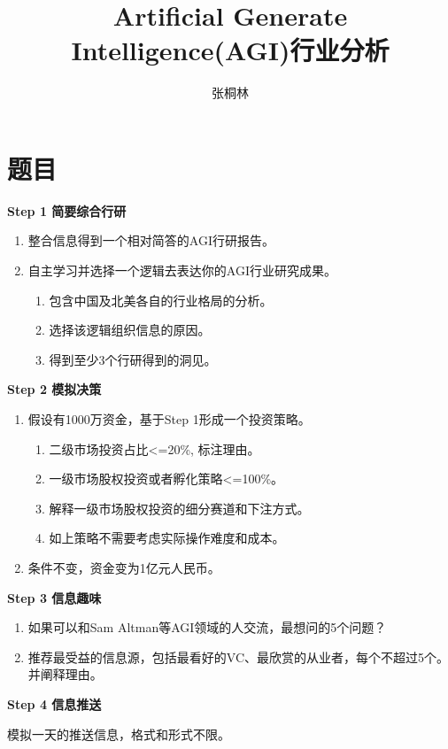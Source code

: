 \documentclass[fontset=overleaf，12pt]{ctexart}
\title{Artificial Generate Intelligence(AGI){\songti 行业分析}}
\author{\heiti 张桐林}
\date{}
\begin{document}
\maketitle
\clearpage



\section*{题目}


\textbf{Step 1 简要综合行研}
\begin{enumerate}
    \item  整合信息得到一个相对简答的AGI行研报告。
    \item   自主学习并选择一个逻辑去表达你的AGI行业研究成果。
    \begin{enumerate}
        \item 包含中国及北美各自的行业格局的分析。
        \item 选择该逻辑组织信息的原因。
        \item 得到至少3个行研得到的洞见。
    \end{enumerate}
\end{enumerate}

\textbf{Step 2 模拟决策}
\begin{enumerate}
    \item 假设有1000万资金，基于Step 1形成一个投资策略。
    \begin{enumerate}
        \item  二级市场投资占比<=20\%, 标注理由。
        \item  一级市场股权投资或者孵化策略<=100\%。
        \item  解释一级市场股权投资的细分赛道和下注方式。
        \item 如上策略不需要考虑实际操作难度和成本。
    \end{enumerate}
    \item 条件不变，资金变为1亿元人民币。
\end{enumerate}
\textbf{Step 3 信息趣味}

\begin{enumerate}
    \item  如果可以和Sam Altman等AGI领域的人交流，最想问的5个问题？
    \item 推荐最受益的信息源，包括最看好的VC、最欣赏的从业者，每个不超过5个。并阐释理由。
\end{enumerate}
\textbf{Step 4 信息推送}

模拟一天的推送信息，格式和形式不限。
\newpage

\newpage

\newpage

\newpage

\end{document}
